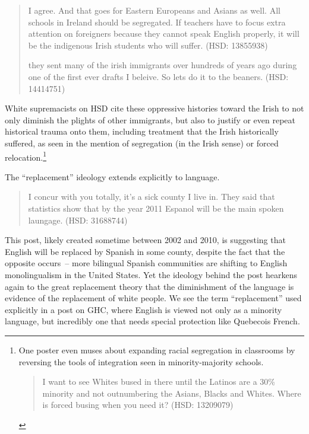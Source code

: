 \documentclass[output=paper,colorlinks,citecolor=brown]{langscibook}
\begin{document}
\begin{quote}I agree. And that goes for Eastern Europeans and Asians as well. All schools in Ireland should be segregated. If teachers have to focus extra attention on foreigners because they cannot speak English properly, it will be the indigenous Irish students who will suffer. (HSD: 13855938)

they sent many of the irish immigrants over hundreds of years ago during one of the first ever drafts I beleive. So lets do it to the beaners. (HSD: 14414751) 
\end{quote}

White supremacists on HSD cite these oppressive histories toward the Irish to not only diminish the plights of other immigrants, but also to justify or even repeat historical trauma onto them, including treatment that the Irish historically suffered, as seen in the mention of segregation (in the Irish sense) or forced relocation.\footnote{One poster even muses about expanding racial segregation in classrooms by reversing the tools of integration seen in minority\hyp majority schools.

\begin{quote} 
I want to see Whites bused in there until the Latinos are a 30\% minority and not outnumbering the Asians, Blacks and Whites. Where is forced busing when you need it? (HSD: 13209079) 
\end{quote}}

The “replacement” ideology extends explicitly to language.

\begin{quote}
I concur with you totally, it's a sick county I live in. They said that statistics show that by the year 2011 Espanol will be the main spoken laungage. (HSD: 31688744) 
\end{quote}

\noindent This post, likely created sometime between 2002 and 2010, is suggesting that English will be replaced by Spanish in some county, despite the fact that the opposite occurs~-- more bilingual Spanish communities are shifting to English monolingualism in the United States. Yet the ideology behind the post hearkens again to the great replacement theory that the diminishment of the language is evidence of the replacement of white people. We see the term ``replacement'' used explicitly in a post on GHC, where English is viewed not only as a minority language, but incredibly one that needs special protection like Quebecois French.
\end{document}
